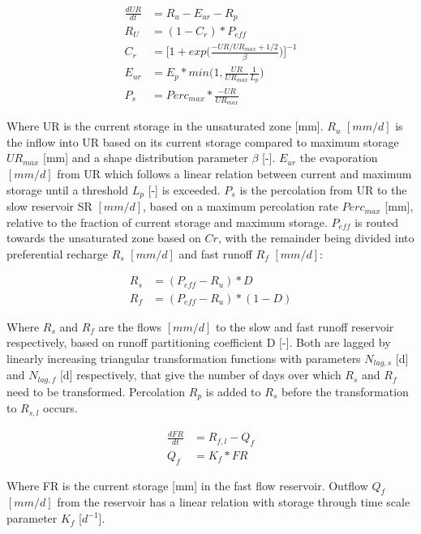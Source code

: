 \begin{align}
	\frac{dUR}{dt} &= R_u - E_{ur} - R_p \\
	R_U &= (1 - C_r) * P_{eff}\\
	C_r &= \Big[1+exp\Big(\frac{-UR/UR_{max} + 1/2}{\beta}\Big)\Big]^{-1}\\
	E_{ur} &= E_p * min\Big(1, \frac{UR}{UR_{max}} \frac{1}{L_p}\Big)\\
	P_s&= Perc_{max} * \frac{-UR}{UR_{max}}
\end{align}
  
Where UR is the current storage in the unsaturated zone [mm]. $R_u$ $[mm/d]$ is the inflow into UR based on its current storage compared to maximum storage $UR_{max}$ [mm] and a shape distribution parameter $\beta$ [-].  $E_{ur}$ the evaporation $[mm/d]$ from UR which follows a linear relation between current and maximum storage until a threshold $L_p$ [-] is exceeded. $P_s$ is the percolation from UR to the slow reservoir SR $[mm/d]$, based on a maximum percolation rate $Perc_{max}$ [mm], relative to the fraction of current storage and maximum storage. $P_{eff}$ is routed towards the unsaturated zone based on $Cr$, with the remainder being divided into preferential recharge $R_s$ $[mm/d]$ and fast runoff $R_f$ $[mm/d]$:

\begin{align}
	R_s &= (P_{eff} - R_u)*D\\
	R_f &= (P_{eff} - R_u)*(1-D)
\end{align}

Where $R_s$ and $R_f$ are the flows $[mm/d]$ to the slow and fast runoff reservoir respectively, based on runoff partitioning coefficient D [-]. Both are lagged by linearly increasing triangular transformation functions with parameters $N_{lag,s}$ [d] and $N_{lag,f}$ [d] respectively, that give the number of days over which $R_s$ and $R_f$ need to be transformed. Percolation $R_p$ is added to $R_s$ before the transformation to $R_{s,l}$ occurs.

\begin{align}
	\frac{dFR}{dt} &= R_{f,l} - Q_f\\
	Q_f &= K_f * FR 
\end{align}

Where FR is the current storage [mm] in the fast flow reservoir. Outflow $Q_f$ $[mm/d]$ from the reservoir has a linear relation with storage through time scale parameter $K_f$ [$d^{-1}$]. 

